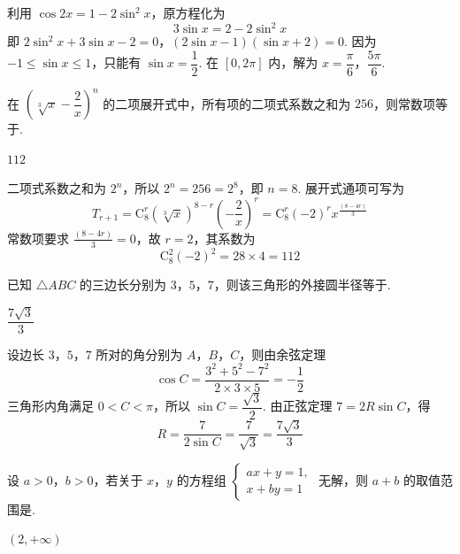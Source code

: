 \begin{solution}
利用 \(\cos2x=1-2\sin^2x\)，原方程化为
\[
3\sin x=2-2\sin^2x
\]
即
\(2\sin^2x+3\sin x-2=0\)，\((2\sin x-1)(\sin x+2)=0\).
因为 \(-1\leq\sin x\leq1\)，只能有 \(\sin x=\dfrac12\). 在 \([0,2\pi]\) 内，解为 \(x=\dfrac\pi6\)，\(\dfrac{5\pi}6\).
\end{solution}

\begin{problem}
在 \(\left(\sqrt[3]{x}-\dfrac2x\right)^n\) 的二项展开式中，所有项的二项式系数之和为 \(256\)，则常数项等于\fillinblank{}.
\end{problem}

\begin{answer}
\(112\)
\end{answer}

\begin{solution}
二项式系数之和为 \(2^n\)，所以 \(2^n=256=2^8\)，即 \(n=8\). 展开式通项可写为
\[
T_{r+1}=\mathrm C_8^r\left(\sqrt[3]{x}\right)^{8-r}\left(-\frac2x\right)^r
 =\mathrm C_8^r(-2)^r x^{\frac{(8-4r)}{3}}
\]
常数项要求 \(\frac{(8-4r)}{3}=0\)，故 \(r=2\)，其系数为
\[
\mathrm C_8^2(-2)^2=28\times4=112
\]
\end{solution}

\begin{problem}
已知 \(\triangle ABC\) 的三边长分别为 \(3\)，\(5\)，\(7\)，则该三角形的外接圆半径等于\fillinblank{}.
\end{problem}

\begin{answer}
\(\dfrac{7\sqrt3}{3}\)
\end{answer}

\begin{solution}
设边长 \(3\)，\(5\)，\(7\) 所对的角分别为 \(A\)，\(B\)，\(C\)，则由余弦定理
\[
\cos C=\frac{3^2+5^2-7^2}{2\times3\times5}=-\frac12
\]
三角形内角满足 \(0<C<\pi\)，所以 \(\sin C=\dfrac{\sqrt3}{2}\). 由正弦定理 \(7=2R\sin C\)，得
\[
R=\frac{7}{2\sin C}=\frac{7}{\sqrt3}=\frac{7\sqrt3}{3}
\]
\end{solution}

\begin{problem}
设 \(a>0\)，\(b>0\)，若关于 \(x\)，\(y\) 的方程组 \(\begin{cases}
ax+y=1,\\
x+by=1
\end{cases}\)
无解，则 \(a+b\) 的取值范围是\fillinblank{}.
\end{problem}

\begin{answer}
\((2,+\infty)\)
\end{answer}

